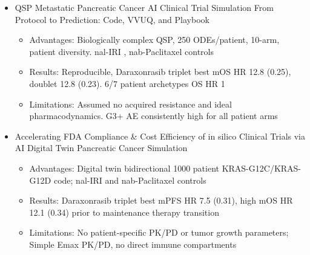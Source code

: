 \documentclass{article}
\begin{document}
    \begin{itemize}[leftmargin=2.5em, itemsep=0em, topsep=-0.3em]
    \item[2)] \fontsize{9.5pt}{10.5pt}\selectfont QSP Metastatic Pancreatic Cancer AI Clinical Trial Simulation From Protocol to Prediction: Code, VVUQ, and Playbook 
    \begin{itemize} [leftmargin=1em, itemsep=0em, topsep=-0.08em] \fontsize{9.5pt}{10.5pt}\selectfont
    \item[\raisebox{0.25ex}{\scalebox{0.7}{$\bullet$}}] Advantages: Biologically complex QSP, 250 ODEs/patient, 10-arm, patient diversity. nal-IRI \cite{Napoli1}, nab-Paclitaxel \cite{MpactNabPaclitaxel} controls 
    \item[\raisebox{0.25ex}{\scalebox{0.7}{$\bullet$}}] Results: Reproducible, Daraxonrasib triplet best mOS HR 12.8 (0.25), doublet 12.8 (0.23). 6/7 patient archetypes OS HR \raisebox{0.3ex}{\scalebox{0.75}<}1
    \item[\raisebox{0.25ex}{\scalebox{0.7}{$\bullet$}}] Limitations: Assumed no acquired resistance and ideal pharmacodynamics. G3+ AE consistently high for all patient arms
    \end{itemize}
    \item[3)] \fontsize{9.5pt}{10.5pt}\selectfont Accelerating FDA Compliance \& Cost Efficiency of in silico Clinical Trials via AI Digital Twin Pancreatic Cancer Simulation 
    \begin{itemize} [leftmargin=1em, itemsep=0em, topsep=-0.08em] \fontsize{9.5pt}{10.5pt}\selectfont
    \item[\raisebox{0.25ex}{\scalebox{0.7}{$\bullet$}}] Advantages: Digital twin bidirectional 1000 patient KRAS-G12C/KRAS-G12D code; nal-IRI and nab-Paclitaxel controls 
    \item[\raisebox{0.25ex}{\scalebox{0.7}{$\bullet$}}] Results: Daraxonrasib triplet best mPFS HR 7.5 (0.31), high mOS HR 12.1 (0.34) prior to maintenance therapy transition 
    \item[\raisebox{0.25ex}{\scalebox{0.7}{$\bullet$}}] Limitations: No patient-specific PK/PD or tumor growth parameters; Simple Emax PK/PD, no direct immune compartments
    \end{itemize}
\end{itemize}
\vspace{0.1cm}
\end{document}
